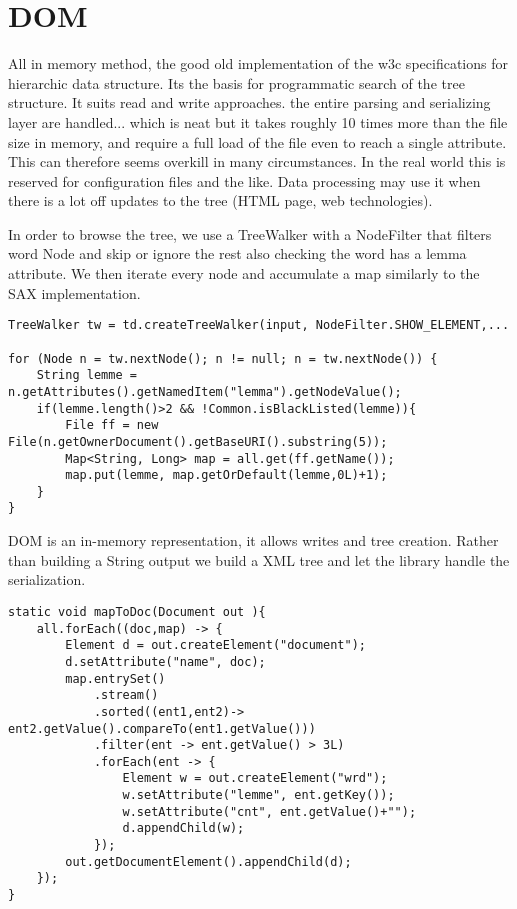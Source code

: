 \documentclass{article}
\begin{document}
\section*{DOM}
All in memory method, the good old implementation of the w3c specifications for hierarchic data structure. Its the basis for programmatic search of the tree structure. It suits read and write approaches. the entire parsing and serializing layer are handled... which is neat but it takes roughly 10 times more than the file size in memory, and require a full load of the file even to reach a single attribute. This can therefore seems overkill in many circumstances. In the real world this is reserved for configuration files and the like. Data processing may use it when there is a lot off updates to the tree (HTML page, web technologies).

In order to browse the tree, we use a TreeWalker with a NodeFilter that filters word Node and skip or ignore the rest also checking the word has a lemma attribute. We then iterate every node and accumulate a map similarly to the SAX implementation. 
\begin{verbatim}
TreeWalker tw = td.createTreeWalker(input, NodeFilter.SHOW_ELEMENT,...

for (Node n = tw.nextNode(); n != null; n = tw.nextNode()) {
    String lemme = n.getAttributes().getNamedItem("lemma").getNodeValue();
    if(lemme.length()>2 && !Common.isBlackListed(lemme)){
        File ff = new File(n.getOwnerDocument().getBaseURI().substring(5));
        Map<String, Long> map = all.get(ff.getName());
        map.put(lemme, map.getOrDefault(lemme,0L)+1);
    }
}
\end{verbatim}

DOM is an in-memory representation, it allows writes and tree creation. Rather than building a String output we build a XML tree and let the library handle the serialization. 

\begin{verbatim}
static void mapToDoc(Document out ){
    all.forEach((doc,map) -> {
        Element d = out.createElement("document");
        d.setAttribute("name", doc);
        map.entrySet()
            .stream()
            .sorted((ent1,ent2)-> ent2.getValue().compareTo(ent1.getValue()))
            .filter(ent -> ent.getValue() > 3L)
            .forEach(ent -> {
                Element w = out.createElement("wrd");
                w.setAttribute("lemme", ent.getKey());
                w.setAttribute("cnt", ent.getValue()+"");
                d.appendChild(w);
            });
        out.getDocumentElement().appendChild(d);
    });
}
\end{verbatim}
\end{document}
